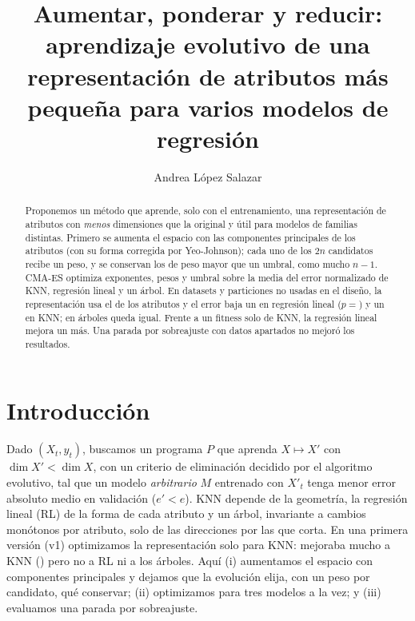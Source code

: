 \documentclass[runningheads]{llncs}
\begin{document}
\title{Aumentar, ponderar y reducir: aprendizaje evolutivo de una representación de atributos más pequeña para
varios modelos de regresión}
\author{Andrea López Salazar}
\maketitle

\begin{abstract}
Proponemos un método que aprende, solo con el entrenamiento, una representación de atributos con \emph{menos}
dimensiones que la original y útil para modelos de familias distintas. Primero se aumenta el espacio con las
componentes principales de los atributos (con su forma corregida por Yeo-Johnson); cada uno de los $2n$ candidatos
recibe un peso, y se conservan los de peso mayor que un umbral, como mucho $n-1$. CMA-ES optimiza exponentes, pesos y
umbral sobre la media del error normalizado de KNN, regresión lineal y un árbol. En \nDatasets{} datasets y
\nParticiones{} particiones no usadas en el diseño, la representación usa el \dosDimMedia{} de los atributos y el
error baja un \dosCambioRL{} en regresión lineal ($p=$\dosPRL) y un \dosCambioKNN{} en KNN; en árboles queda igual.
Frente a un fitness solo de KNN, la regresión lineal mejora un \dosVsUnoRL{} más. Una parada por sobreajuste con datos
apartados no mejoró los resultados.
\end{abstract}

\section{Introducción}
Dado $(X_t,y_t)$, buscamos un programa $P$ que aprenda $X\mapsto X'$ con $\dim X'<\dim X$, con un criterio de
eliminación decidido por el algoritmo evolutivo, tal que un modelo \emph{arbitrario} $M$ entrenado con $X'_t$ tenga
menor error absoluto medio en validación ($e'<e$). KNN depende de la geometría, la regresión lineal (RL) de la forma de
cada atributo y un árbol, invariante a cambios monótonos por atributo, solo de las direcciones por las que corta. En una
primera versión (v1) optimizamos la representación solo para KNN: mejoraba mucho a KNN (\cambioKNN) pero no a RL ni a
los árboles. Aquí (i) aumentamos el espacio con componentes principales y dejamos que la evolución elija, con un peso
por candidato, qué conservar; (ii) optimizamos para tres modelos a la vez; y (iii) evaluamos una parada por sobreajuste.
\end{document}
